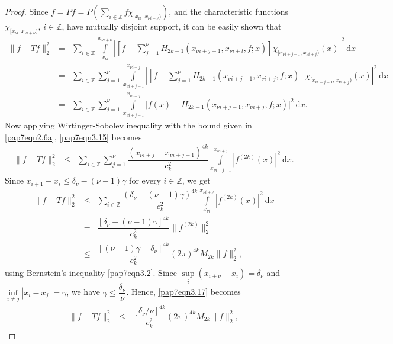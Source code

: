 \documentclass[a4paper,12pt,reqno]{amsart}
\theoremstyle{plain}
\numberwithin{equation}{section}
\theoremstyle{definition}
\newcounter {own}
\newcommand{\ds}{\displaystyle}
\begin{document}
\begin{proof}
Since  $f=Pf=P\left(\ds\sum\limits_{i\in\mathbb{Z}}f\chi_{[x_{\nu i},x_{\nu i+\nu})}\right)$, and the characteristic functions $\chi_{[x_{\nu i},x_{\nu i+\nu})}$, $i\in\mathbb{Z}$, have mutually disjoint support,
it can be easily shown that
\begin{eqnarray}\label{pap7eqn3.15}
\|f-T f\|_2^2
&=&\ds\sum\limits_{i\in\mathbb{Z}}\int\limits_{x_{\nu i}}^{x_{\nu i+\nu}}\left|\left[f-\sum\limits_{j=1}^{\nu}H_{2k-1}(x_{\nu i+j-1},x_{\nu i+l},f;x)\right]\chi_{[x_{\nu i+j-1},x_{\nu i+j})}(x)\right|^2~\mathrm{d}x\nonumber\\
&=&\ds\sum\limits_{i\in\mathbb{Z}}\sum\limits_{j=1}^\nu\int\limits_{x_{\nu i+j-1}}^{x_{\nu i+j}}\left|\left[f-\sum\limits_{j=1}^{\nu}H_{2k-1}(x_{\nu i+j-1},x_{\nu i+j},f;x)\right]\chi_{[x_{\nu i+j-1},x_{\nu i+j})}(x)\right|^2~\mathrm{d}x\nonumber\\
&=&\ds\sum\limits_{i\in\mathbb{Z}}\sum\limits_{j=1}^{\nu}\int\limits_{x_{\nu i+j-1}}^{x_{\nu i+j}}\big|f(x)-H_{2k-1}(x_{\nu i+j-1},x_{\nu i+j},f;x)\big|^2~\mathrm{d}x.
\end{eqnarray}
Now applying Wirtinger-Sobolev inequality with the bound  given in \eqref{pap7eqn2.6a}, \eqref{pap7eqn3.15} becomes
\begin{eqnarray}
\|f-Tf\|_2^2
&\leq&\ds\sum\limits_{i\in\mathbb{Z}}\sum\limits_{j=1}^{\nu}\dfrac{(x_{\nu i+j}-x_{\nu i+j-1})^{4k}}{c_{k}^2}
\int\limits_{x_{\nu i+j-1}}^{x_{\nu i+j}}|f^{(2k)}(x)|^2~\mathrm{d}x.
\end{eqnarray}
Since $x_{i+1}-x_i\leq\delta_\nu-(\nu-1)\gamma$ for every $i\in\mathbb{Z}$, we get
\begin{eqnarray}\label{pap7eqn3.17}
\|f-Tf\|_2^2
&\leq&\ds\sum\limits_{i\in\mathbb{Z}}\dfrac{(\delta_\nu-(\nu-1)\gamma)^{4k}}{c_{k}^2}
\int\limits_{x_{\nu i}}^{x_{\nu i+\nu}}|f^{(2k)}(x)|^2~\mathrm{d}x\nonumber\\
&=&\dfrac{[\delta_\nu-(\nu-1)\gamma]^{4k}}{c_{k}^2}\|f^{(2k)}\|_2^2\nonumber\\
&\leq&\dfrac{[(\nu-1) \gamma-\delta_\nu]^{4k}}{c_{k}^2}(2\pi)^{4k}M_{2k}\|f\|_2^2,
\end{eqnarray}
using Bernstein's inequality \eqref{pap7eqn3.2}.
Since $\sup\limits_i(x_{i+\nu}-x_i)=\delta_\nu$ and $\inf\limits_{i\neq j} |x_i-x_j|=\gamma$, we have $\gamma\leq\dfrac{\delta_\nu}{\nu}$. Hence, \eqref{pap7eqn3.17} becomes
\begin{eqnarray}
\|f-Tf\|_2^2
&\leq&\dfrac{\left[\delta_\nu/\nu\right]^{4k}}{c_{k}^2}(2\pi)^{4k}M_{2k}\|f\|_2^2,
\end{eqnarray}

\end{proof}
\end{document}
